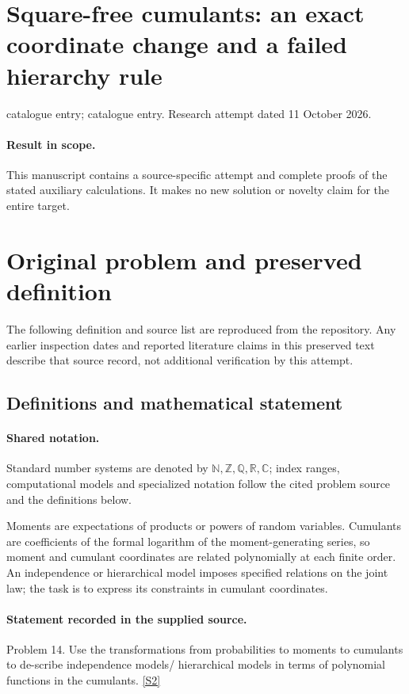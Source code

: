 \documentclass[11pt]{article}
\begin{document}
\section*{Square-free cumulants: an exact coordinate change and a failed hierarchy rule}
\noindent catalogue entry; catalogue entry. Research attempt dated 11 October 2026.
\paragraph{Result in scope.}This manuscript contains a source-specific attempt and complete proofs of the stated auxiliary calculations. It makes no new solution or novelty claim for the entire target.
\section{Original problem and preserved definition}
The following definition and source list are reproduced from the repository. Any earlier inspection dates and reported literature claims in this preserved text describe that source record, not additional verification by this attempt.
\subsection{Definitions and mathematical statement}

\paragraph{Shared notation.}Standard number systems are denoted by $\mathbb N,\mathbb Z,\mathbb Q,\mathbb R,\mathbb C$; index ranges, computational models and specialized notation follow the cited problem source and the definitions below.


Moments are expectations of products or powers of random variables. Cumulants are coefficients of the formal logarithm of the moment-generating series, so moment and cumulant coordinates are related polynomially at each finite order. An independence or hierarchical model imposes specified relations on the joint law; the task is to express its constraints in cumulant coordinates.
\paragraph{Statement recorded in the supplied source.}
Problem 14. Use the transformations from probabilities to moments to cumulants to de-scribe independence models/ hierarchical models in terms of polynomial functions in the cumulants. \href{https://aimath.org/WWN/compalgstat/compalgstat.pdf}{[S2]}
\end{document}
